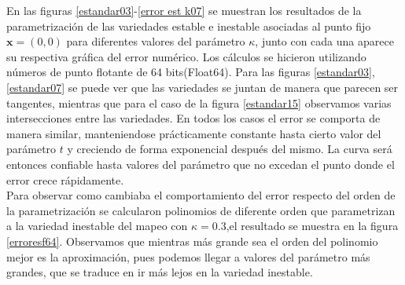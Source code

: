 En las figuras \ref{estandar03}-\ref{error est k07} se muestran los resultados de la parametrización de las variedades estable e inestable asociadas al punto fijo $\mathbf{x}=(0,0)$ para diferentes valores del parámetro $\kappa$, junto con cada una aparece su respectiva gráfica del error numérico.  Los cálculos se hicieron utilizando números de punto flotante de 64 bits(Float64). Para las figuras \ref{estandar03}, \ref{estandar07} se puede ver que las variedades se juntan de manera que parecen ser tangentes, mientras que para el caso de la figura \ref{estandar15} observamos varias intersecciones entre las variedades. En todos los casos el error se comporta de manera similar, manteniendose prácticamente constante hasta cierto valor del parámetro $t$ y creciendo de forma exponencial después del mismo. La curva será entonces confiable hasta valores del parámetro que no excedan el punto donde el error crece rápidamente.  \\


Para observar como cambiaba el comportamiento del error respecto del orden de la parametrización se calcularon polinomios de diferente orden que parametrizan a la variedad inestable del mapeo con $\kappa=0.3$,el resultado se muestra en la figura \ref{erroresf64}. Observamos que mientras más grande sea el orden del polinomio mejor es la aproximación, pues podemos llegar a valores del parámetro más grandes, que se traduce en ir más lejos en la variedad inestable. \\

